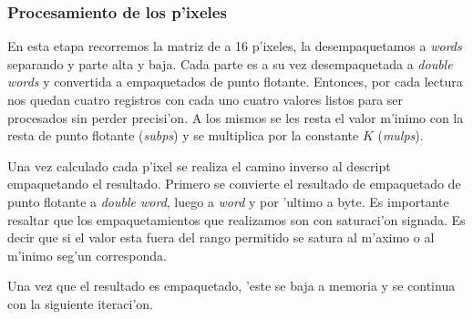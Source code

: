 \subsubsection*{Procesamiento de los p'ixeles}

En esta etapa recorremos la matriz de a 16 p'ixeles, la desempaquetamos a \textit{words} separando y parte alta y baja. Cada parte es a su vez desempaquetada a  \textit{double words} y convertida a empaquetados de punto flotante. Entonces, por cada lectura nos quedan cuatro registros con cada uno cuatro valores listos para ser procesados sin perder precisi'on. A los mismos se les resta el valor m'inimo con la resta de punto flotante (\textit{subps}) y se multiplica por la constante $K$ (\textit{mulps}).

Una vez calculado cada p'ixel se realiza el camino inverso al descript empaquetando el resultado. Primero se convierte el resultado de empaquetado de punto flotante a \textit{double word}, luego a \textit{word} y por 'ultimo a byte. Es importante resaltar que los empaquetamientos que realizamos son con saturaci'on signada. Es decir que si el valor esta fuera del rango permitido se satura al m'aximo o al m'inimo seg'un corresponda. 

Una vez que el resultado es empaquetado, 'este se baja a memoria y se continua con la siguiente iteraci'on.


